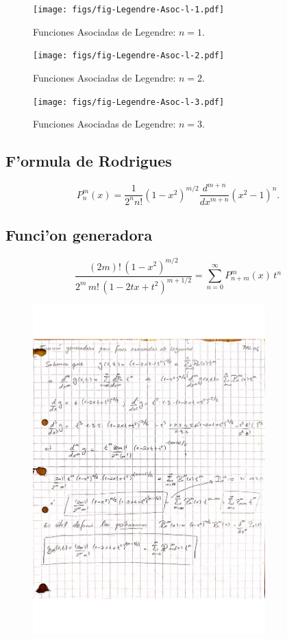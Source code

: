 \begin{figure}[H]
\centering
\texttt{[image: figs/fig-Legendre-Asoc-l-1.pdf]}
\caption{Funciones Asociadas de Legendre: $n=1$.}
\label{fig-P1m}
\end{figure}
\begin{figure}[H]
\centering
\texttt{[image: figs/fig-Legendre-Asoc-l-2.pdf]}
\caption{Funciones Asociadas de Legendre: $n=2$.}
\label{fig-P2m}
\end{figure}
\begin{figure}[H]
\centering
\texttt{[image: figs/fig-Legendre-Asoc-l-3.pdf]}
\caption{Funciones Asociadas de Legendre: $n=3$.}
\label{fig-P3m}
\end{figure}
\subsection{F'ormula de Rodrigues}

\begin{equation}
P_{n}^{m}(x)=\frac{1}{2^{n}n!}(1-x^2)^{m/2}\frac{d^{m+n}}{dx^{m+n}}(x^2-1)^{n}.
\end{equation}

\subsection{Funci'on generadora}

\begin{equation}
\frac{(2m)! \, (1-x^2)^{m/2}}{2^{m}\, m! \, (1-2tx+t^2)^{m+1/2}} = \sum_{n=0}^{\infty} P_{n+m}^{m}(x) \, t^n
\end{equation}
\begin{figure}[H]
\centering
\includegraphics[angle=0,width=0.8\textwidth]{figs/FM2-01_5.pdf}
\end{figure}

